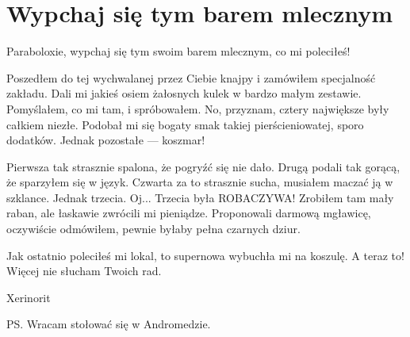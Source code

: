 \chapter{Wypchaj się tym barem mlecznym}


Paraboloxie, wypchaj się tym swoim barem mlecznym, co mi poleciłeś!

Poszedłem do tej wychwalanej przez Ciebie knajpy i zamówiłem specjalność zakładu.
Dali mi jakieś osiem żałosnych kulek w bardzo małym zestawie.
Pomyślałem, co mi tam, i spróbowałem.
No, przyznam, cztery największe były całkiem niezłe. Podobał mi się bogaty smak takiej pierścieniowatej, sporo dodatków.
Jednak pozostałe --- koszmar!

Pierwsza tak strasznie spalona, że pogryźć się nie dało.
Drugą podali tak gorącą, że sparzyłem się w język.
Czwarta za to strasznie sucha, musiałem maczać ją w szklance.
Jednak trzecia. Oj... Trzecia była ROBACZYWA!
Zrobiłem tam mały raban, ale łaskawie zwrócili mi pieniądze.
Proponowali darmową mgławicę, oczywiście odmówiłem, pewnie byłaby pełna czarnych dziur.

Jak ostatnio poleciłeś mi lokal, to supernowa wybuchła mi na koszulę. A teraz to! Więcej nie słucham Twoich rad.

Xerinorit

PS. Wracam stołować się w Andromedzie.
